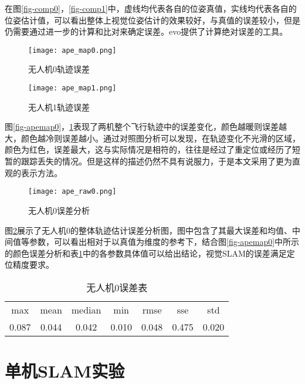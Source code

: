 在图\ref{fig-comp0}，\ref{fig-comp1}中，虚线均代表各自的位姿真值，实线均代表各自的位姿估计值，可以看出整体上视觉位姿估计的效果较好，与真值的误差较小，但是仍需要通过进一步的计算和比对来确定误差。evo提供了计算绝对误差的工具。

\begin{figure}[htbp]
	\centering
	\begin{minipage}[t]{0.45\columnwidth} %
		\centering
		\texttt{[image: ape\_map0.png]}
		\caption{无人机0轨迹误差}
		\label{fig-apemap0}
	\end{minipage}
	\begin{minipage}[t]{0.45\columnwidth}
		\centering
		\texttt{[image: ape\_map1.png]}
		\caption{无人机1轨迹误差}
		\label{fig-apemap1}
	\end{minipage}
\end{figure}

图\ref{fig-apemap0}，\ref{fig-apemap1}表现了两机整个飞行轨迹中的误差变化，颜色越暖则误差越大，颜色越冷则误差越小。通过对照图分析可以发现，在轨迹变化不光滑的区域，颜色为红色，误差最大，这与实际情况是相符的，往往是经过了重定位或经历了短暂的跟踪丢失的情况。但是这样的描述仍然不具有说服力，于是本文采用了更为直观的表示方法。

\begin{figure}[!ht]
	\centering
	\texttt{[image: ape\_raw0.png]}
	\caption{无人机0误差分析}
	\label{fig-aperaw0}
\end{figure}

图\ref{fig-aperaw0}展示了无人机0的整体轨迹估计误差分析图，图中包含了其最大误差和均值、中间值等参数，可以看出相对于以真值为维度的参考下，结合图\ref{fig-apemap0}中所示的颜色误差分析和表\ref{error-euroc}中的各参数具体值可以给出结论，视觉SLAM的误差满足定位精度要求。

\begin{table}[!htbp]
	\centering
	\caption{无人机0误差表}\label{error-euroc}%
	\begin{tabular}{ccccccc}
		\toprule
		
		max& mean & median & min & rmse & sse & std\\
		0.087 & 0.044 & 0.042 &  0.010 & 0.048 & 0.475 & 0.020\\
		
		\bottomrule
	\end{tabular}
\end{table}

\section{单机SLAM实验}

